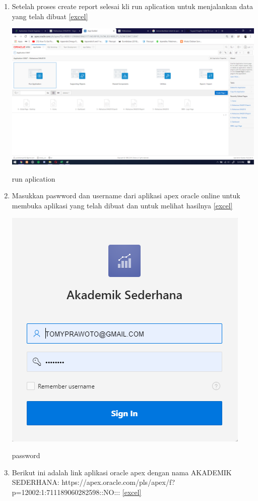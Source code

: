 \documentclass{article}
\begin{document}
\begin{enumerate}
     \item Setelah proses create report selesai kli run aplication untuk menjalankan data yang telah dibuat
      \ref{excel}
    \begin{center}
         \centering
            \includegraphics[scale=0.27]{figures/DB6.png}
        \caption{run aplication}
        \label{excel}
    \end{center}
    
      \item Masukkan paswword dan username dari aplikasi apex oracle online untuk membuka aplikasi yang telah dibuat dan untuk melihat hasilnya
      \ref{excel}
    \begin{center}
         \centering
            \includegraphics[scale=0.27]{figures/DB7.png}
        \caption{password}
        \label{excel}
    \end{center}
    
    
    \item Berikut ini adalah link aplikasi oracle apex dengan nama AKADEMIK SEDERHANA:  https://apex.oracle.com/pls/apex/f?p=12002:1:711189060282598::NO:::
      \ref{excel}
    \begin{center}
         \centering
        \label{excel}
    \end{center}
    
    
    
\end{enumerate}
\end{document}
